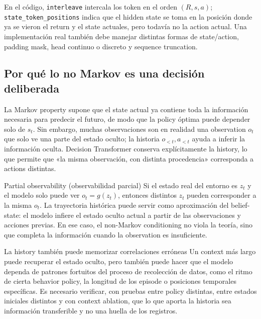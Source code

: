 En el código, \texttt{interleave} intercala los token en el orden $(R,s,a)$; \texttt{state\_token\_positions} indica que el hidden state se toma en la posición donde ya se vieron el return y el state actuales, pero todavía no la action actual. Una implementación real también debe manejar distintas formas de state/action, padding mask, head continuo o discreto y sequence truncation.

\subsection{Por qué lo no Markov es una decisión deliberada}

La Markov property supone que el state actual ya contiene toda la información necesaria para predecir el futuro, de modo que la policy óptima puede depender solo de $s_t$. Sin embargo, muchas observaciones son en realidad una observation $o_t$ que solo ve una parte del estado oculto; la historia $o_{<t},a_{<t}$ ayuda a inferir la información oculta. Decision Transformer conserva explícitamente la history, lo que permite que «la misma observación, con distinta procedencia» corresponda a actions distintas.

\begin{knowledgebox}{Partial observability (observabilidad parcial)}
Si el estado real del entorno es $z_t$ y el modelo solo puede ver $o_t=g(z_t)$, entonces distintos $z_t$ pueden corresponder a la misma $o_t$. La trayectoria histórica puede servir como aproximación del belief-state: el modelo infiere el estado oculto actual a partir de las observaciones y acciones previas. En ese caso, el non-Markov conditioning no viola la teoría, sino que completa la información cuando la observation es insuficiente.
\end{knowledgebox}


\begin{warningbox}{La history también puede memorizar correlaciones erróneas}
Un context más largo puede recuperar el estado oculto, pero también puede hacer que el modelo dependa de patrones fortuitos del proceso de recolección de datos, como el ritmo de cierta behavior policy, la longitud de los episode o posiciones temporales específicas. Es necesario verificar, con pruebas entre policy distintas, entre estados iniciales distintos y con context ablation, que lo que aporta la historia sea información transferible y no una huella de los registros.
\end{warningbox}

